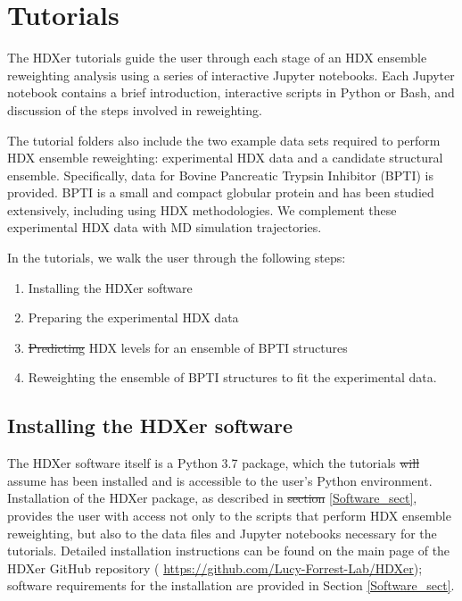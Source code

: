 \documentclass[9pt,tutorial]{livecoms}
\providecommand{\DIFadd}[1]{{\protect\color{blue}\uwave{#1}}} %
\providecommand{\DIFdel}[1]{{\protect\color{red}\sout{#1}}}                      %
\providecommand{\DIFaddbegin}{} %
\providecommand{\DIFaddend}{} %
\providecommand{\DIFdelbegin}{} %
\providecommand{\DIFdelend}{} %
\begin{document}
\section{Tutorials}\label{tutorial_sect}

The HDXer tutorials guide the user through each stage of an HDX ensemble reweighting analysis using a series of interactive Jupyter notebooks.
Each Jupyter notebook contains a brief introduction, interactive scripts in Python or Bash, and discussion of the steps involved in reweighting.

The tutorial folders also include the two example data sets required to perform HDX ensemble reweighting: experimental HDX data and a candidate structural ensemble.
Specifically, data for Bovine Pancreatic Trypsin Inhibitor (BPTI) is provided.
BPTI is a small and compact globular protein and has been studied extensively, including using HDX methodologies. 
We complement these experimental HDX data with MD simulation trajectories.

In the tutorials, we walk the user through the following steps:
\begin{enumerate}
  \item Installing the HDXer software
  \item Preparing the experimental HDX data
  \item \DIFdelbegin \DIFdel{Predicting }\DIFdelend \DIFaddbegin \DIFadd{Computing }\DIFaddend HDX levels for an ensemble of BPTI structures
  \item Reweighting the ensemble of BPTI structures to fit the experimental data.
\end{enumerate}

\subsection{Installing the HDXer software}
The HDXer software itself is a Python 3.7 package, which the tutorials \DIFdelbegin \DIFdel{will }\DIFdelend assume has been installed and is accessible to the user's Python environment.
Installation of the HDXer package, as described in \DIFdelbegin \DIFdel{section }\DIFdelend \DIFaddbegin \DIFadd{Section }\DIFaddend \ref{Software_sect}, provides the user with access not only to the scripts that perform HDX ensemble reweighting, but also to the data files and Jupyter notebooks necessary for the tutorials.
Detailed installation instructions can be found on the main page of the HDXer GitHub repository (\DIFdelbegin %
\DIFdelend \DIFaddbegin \url{https://github.com/Lucy-Forrest-Lab/HDXer}\DIFaddend ); software requirements for the installation are provided in Section \ref{Software_sect}. 
\end{document}
